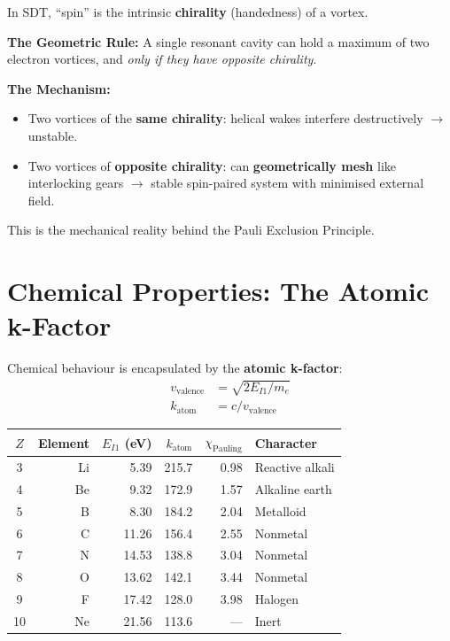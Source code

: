 In SDT, ``spin'' is the intrinsic \textbf{chirality} (handedness) of a vortex.

\textbf{The Geometric Rule:} A single resonant cavity can hold a maximum of two electron vortices, and \emph{only if they have opposite chirality}.

\textbf{The Mechanism:}
\begin{itemize}
  \item Two vortices of the \textbf{same chirality}: helical wakes interfere destructively $\to$ unstable.
  \item Two vortices of \textbf{opposite chirality}: can \textbf{geometrically mesh} like interlocking gears $\to$ stable spin-paired system with minimised external field.
\end{itemize}

This is the mechanical reality behind the Pauli Exclusion Principle.


\section{Chemical Properties: The Atomic k-Factor}

Chemical behaviour is encapsulated by the \textbf{atomic k-factor}:
\begin{align}
  v_{\text{valence}} &= \sqrt{2 E_{I1} / m_e} \label{eq:v-valence} \\
  k_{\text{atom}} &= c / v_{\text{valence}} \label{eq:k-atom}
\end{align}

\begin{center}
\begin{tabular}{crrrrl}
\hline
$Z$ & \textbf{Element} & $E_{I1}$ (eV) & $k_{\text{atom}}$ & $\chi_{\text{Pauling}}$ & \textbf{Character} \\
\hline
 3 & Li & 5.39 & 215.7 & 0.98 & Reactive alkali \\
 4 & Be & 9.32 & 172.9 & 1.57 & Alkaline earth \\
 5 & B  & 8.30 & 184.2 & 2.04 & Metalloid \\
 6 & C  & 11.26 & 156.4 & 2.55 & Nonmetal \\
 7 & N  & 14.53 & 138.8 & 3.04 & Nonmetal \\
 8 & O  & 13.62 & 142.1 & 3.44 & Nonmetal \\
 9 & F  & 17.42 & 128.0 & 3.98 & Halogen \\
10 & Ne & 21.56 & 113.6 & --- & Inert \\
\hline
\end{tabular}
\end{center}

